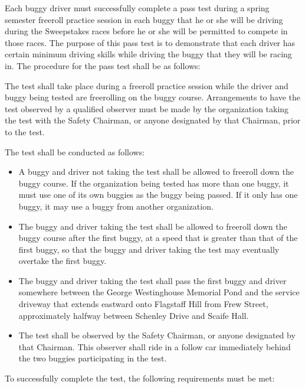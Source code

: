 	Each buggy driver must successfully complete a pass test during a spring semester freeroll practice session in each buggy that he or she will be driving during the Sweepstakes races before he or she will be permitted to compete in those races. The purpose of this pass test is to demonstrate that each driver has certain minimum driving skills while driving the buggy that they will be racing in. The procedure for the pass test shall be as follows:
	
	The test shall take place during a freeroll practice session while the driver and buggy being tested are freerolling on the buggy course. Arrangements to have the test observed by a qualified observer must be made by the organization taking the test with the Safety Chairman, or anyone designated by that Chairman, prior to the test.
	
	The test shall be conducted as follows:

	\begin{itemize}

		\item A buggy and driver not taking the test shall be allowed to freeroll down the buggy course. If the organization being tested has more than one buggy, it must use one of its own buggies as the buggy being passed. If it only has one buggy, it may use a buggy from another organization.

		\item The buggy and driver taking the test shall be allowed to freeroll down the buggy course after the first buggy, at a speed that is greater than that of the first buggy, so that the buggy and driver taking the test may eventually overtake the first buggy.

		\item The buggy and driver taking the test shall pass the first buggy and driver somewhere between the George Westinghouse Memorial Pond and the service driveway that extends eastward onto Flagstaff Hill from Frew Street, approximately halfway between Schenley Drive and Scaife Hall.

		\item The test shall be observed by the Safety Chairman, or anyone designated by that Chairman. This observer shall ride in a follow car immediately behind the two buggies participating in the test.

	\end{itemize}

	\noindent To successfully complete the test, the following requirements must be met:

